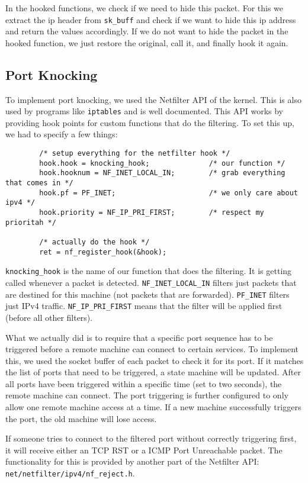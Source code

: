 \documentclass[10pt, letterpaper]{scrartcl}
\begin{document}
In the hooked functions, we check if we need to hide this packet.
For this we extract the ip header from \texttt{sk\_buff} and check if we want to hide this ip address and return the values accordingly. 
If we do not want to hide the packet in the hooked function, we just restore the original, call it, and finally hook it again. 
  
\subsection{Port Knocking}
To implement port knocking, we used the Netfilter API of the kernel.
This is also used by programs like \texttt{iptables} and is well documented.
This API works by providing hook points for custom functions that do the filtering.
To set this up, we had to specify a few things:

\begin{verbatim}
        /* setup everything for the netfilter hook */
        hook.hook = knocking_hook;              /* our function */
        hook.hooknum = NF_INET_LOCAL_IN;        /* grab everything that comes in */
        hook.pf = PF_INET;                      /* we only care about ipv4 */
        hook.priority = NF_IP_PRI_FIRST;        /* respect my prioritah */

        /* actually do the hook */
        ret = nf_register_hook(&hook);
\end{verbatim} 

\texttt{knocking\_hook} is the name of our function that does the filtering. It is getting called whenever a packet is detected. \texttt{NF\_INET\_LOCAL\_IN} filters just packets that are destined for this machine (not packets that are forwarded). \texttt{PF\_INET} filters just IPv4 traffic. \texttt{NF\_IP\_PRI\_FIRST} means that the filter will be applied first (before all other filters).

What we actually did is to require that a specific port sequence has to be triggered before a remote machine can connect to certain services.
To implement this, we used the socket buffer of each packet to check it for its port.
If it matches the list of ports that need to be triggered, a state machine will be updated.
After all ports have been triggered within a specific time (set to two seconds), the remote machine can connect.
The port triggering is further configured to only allow one remote machine access at a time.
If a new machine successfully triggers the port, the old machine will lose access.

If someone tries to connect to the filtered port without correctly triggering first, it will receive either an TCP RST or a ICMP Port Unreachable packet.
The functionality for this is provided by another part of the Netfilter API: \texttt{net/netfilter/ipv4/nf\_reject.h}.
\end{document}
